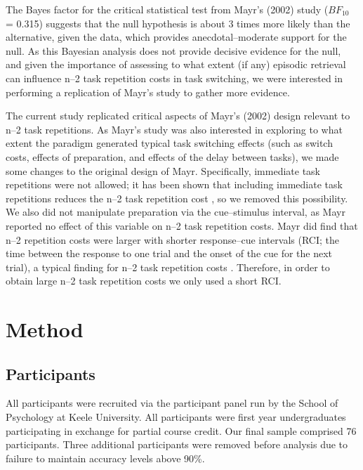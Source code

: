 \documentclass[a4paper, doc, natbib]{apa6}
\begin{document}
The Bayes factor for the critical statistical test from Mayr's (2002) study ($BF_{10}$ = 0.315) suggests that the null hypothesis is about 3 times more likely than the alternative, given the data, which provides anecdotal--moderate support for the null. As this Bayesian analysis does not provide decisive evidence for the null, and given the importance of assessing to what extent (if any) episodic retrieval can influence n--2 task repetition costs in task switching, we were interested in performing a replication of Mayr's study to gather more evidence.

The current study replicated critical aspects of Mayr's (2002) design relevant to n--2 task repetitions. As Mayr's study was also interested in exploring to what extent the paradigm generated typical task switching effects (such as switch costs, effects of preparation, and effects of the delay between tasks), we made some changes to the original design of Mayr. Specifically, immediate task repetitions were not allowed; it has been shown that including immediate task repetitions reduces the n--2 task repetition cost \citep{Philipp2006}, so we removed this possibility. We also did not manipulate preparation via the cue--stimulus interval, as Mayr reported no effect of this variable on n--2 task repetition costs. Mayr did find that n--2 repetition costs were larger with shorter response--cue intervals (RCI; the time between the response to one trial and the onset of the cue for the next trial), a typical finding for n--2 task repetition costs \citep{Gade2005, Grange2009, Mayr2000}. Therefore, in order to obtain large n--2 task repetition costs we only used a short RCI. 

\section{Method}

\subsection{Participants}
All participants were recruited via the participant panel run by the School of Psychology at Keele University. All participants were first year undergraduates participating in exchange for partial course credit. Our final sample comprised 76 participants. Three additional participants were removed before analysis due to failure to maintain accuracy levels above 90\%.
\end{document}
